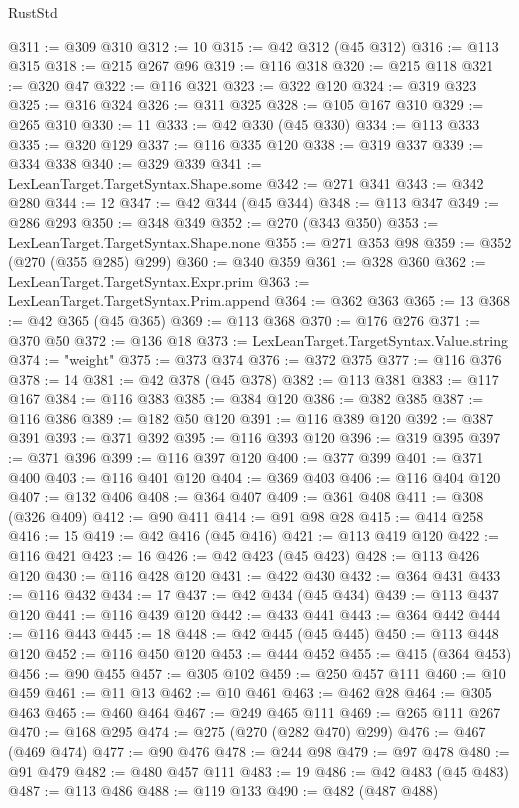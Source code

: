 \begin{lexlean}{RustStd}
\begin{coremodule}
@311 := @309 @310
@312 := 10
@315 := @42 @312 (@45 @312)
@316 := @113 @315
@318 := @215 @267 @96
@319 := @116 @318
@320 := @215 @118
@321 := @320 @47
@322 := @116 @321
@323 := @322 @120
@324 := @319 @323
@325 := @316 @324
@326 := @311 @325
@328 := @105 @167 @310
@329 := @265 @310
@330 := 11
@333 := @42 @330 (@45 @330)
@334 := @113 @333
@335 := @320 @129
@337 := @116 @335 @120
@338 := @319 @337
@339 := @334 @338
@340 := @329 @339
@341 := LexLeanTarget.TargetSyntax.Shape.some
@342 := @271 @341
@343 := @342 @280
@344 := 12
@347 := @42 @344 (@45 @344)
@348 := @113 @347
@349 := @286 @293
@350 := @348 @349
@352 := @270 (@343 @350)
@353 := LexLeanTarget.TargetSyntax.Shape.none
@355 := @271 @353 @98
@359 := @352 (@270 (@355 @285) @299)
@360 := @340 @359
@361 := @328 @360
@362 := LexLeanTarget.TargetSyntax.Expr.prim
@363 := LexLeanTarget.TargetSyntax.Prim.append
@364 := @362 @363
@365 := 13
@368 := @42 @365 (@45 @365)
@369 := @113 @368
@370 := @176 @276
@371 := @370 @50
@372 := @136 @18
@373 := LexLeanTarget.TargetSyntax.Value.string
@374 := "weight"
@375 := @373 @374
@376 := @372 @375
@377 := @116 @376
@378 := 14
@381 := @42 @378 (@45 @378)
@382 := @113 @381
@383 := @117 @167
@384 := @116 @383
@385 := @384 @120
@386 := @382 @385
@387 := @116 @386
@389 := @182 @50 @120
@391 := @116 @389 @120
@392 := @387 @391
@393 := @371 @392
@395 := @116 @393 @120
@396 := @319 @395
@397 := @371 @396
@399 := @116 @397 @120
@400 := @377 @399
@401 := @371 @400
@403 := @116 @401 @120
@404 := @369 @403
@406 := @116 @404 @120
@407 := @132 @406
@408 := @364 @407
@409 := @361 @408
@411 := @308 (@326 @409)
@412 := @90 @411
@414 := @91 @98 @28
@415 := @414 @258
@416 := 15
@419 := @42 @416 (@45 @416)
@421 := @113 @419 @120
@422 := @116 @421
@423 := 16
@426 := @42 @423 (@45 @423)
@428 := @113 @426 @120
@430 := @116 @428 @120
@431 := @422 @430
@432 := @364 @431
@433 := @116 @432
@434 := 17
@437 := @42 @434 (@45 @434)
@439 := @113 @437 @120
@441 := @116 @439 @120
@442 := @433 @441
@443 := @364 @442
@444 := @116 @443
@445 := 18
@448 := @42 @445 (@45 @445)
@450 := @113 @448 @120
@452 := @116 @450 @120
@453 := @444 @452
@455 := @415 (@364 @453)
@456 := @90 @455
@457 := @305 @102
@459 := @250 @457 @111
@460 := @10 @459
@461 := @11 @13
@462 := @10 @461
@463 := @462 @28
@464 := @305 @463
@465 := @460 @464
@467 := @249 @465 @111
@469 := @265 @111 @267
@470 := @168 @295
@474 := @275 (@270 (@282 @470) @299)
@476 := @467 (@469 @474)
@477 := @90 @476
@478 := @244 @98
@479 := @97 @478
@480 := @91 @479
@482 := @480 @457 @111
@483 := 19
@486 := @42 @483 (@45 @483)
@487 := @113 @486
@488 := @119 @133
@490 := @482 (@487 @488)

\end{coremodule}
\end{lexlean}
